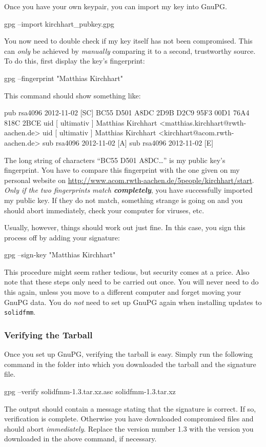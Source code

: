 \documentclass{scrbook}
\newcommand{\solidfmm}{\texttt{solidfmm}}
\begin{document}
Once you have your own keypair, you can import my key into GnuPG.
\begin{commandshell*}
gpg --import kirchhart_pubkey.gpg
\end{commandshell*}
You now need to double check if my key itself has not been compromised. This
can \emph{only} be achieved by \emph{manually} comparing it to a second,
trustworthy source. To do this, first display the key's fingerprint:
\begin{commandshell*}
gpg --fingerprint "Matthias Kirchhart"
\end{commandshell*}
This command should show something like:
\begin{commandshell*}
pub   rsa4096 2012-11-02 [SC]
      BC55 D501 A8DC 2D9B D2C9  95F3 00D1 76A4 818C 2BCE
uid        [ ultimativ ] Matthias Kirchhart <matthias.kirchhart@rwth-aachen.de>
uid        [ ultimativ ] Matthias Kirchhart <kirchhart@acom.rwth-aachen.de>
sub   rsa4096 2012-11-02 [A]
sub   rsa4096 2012-11-02 [E]
\end{commandshell*}
The long string of characters \enquote{BC55 D501 A8DC…} is my public key's
fingerprint. You have to compare this fingerprint with the one given on
my personal website on
\url{http://www.acom.rwth-aachen.de/5people/kirchhart/start}.
\emph{Only if the two fingerprints match \textbf{completely}}, you have
successfully imported my public key. If they do not match, something strange
is going on and you should abort immediately, check your computer for viruses,
etc.

Usually, however, things should work out just fine. In this case, you sign this
process off by adding your signature:
\begin{commandshell*}
gpg --sign-key "Matthias Kirchhart"
\end{commandshell*}
This procedure might seem rather tedious, but security comes at a price. Also
note  that these steps only need to be carried out once. You will never need to
do this again, unless you move to a different computer and forget moving your
GnuPG data. You do \emph{not} need to set up GnuPG again when installing
updates to \solidfmm.

\subsubsection{Verifying the Tarball}
Once you set up GnuPG, verifying the tarball is easy. Simply run the following
command in the folder into which you downloaded the tarball and the signature
file. 
\begin{commandshell*}
gpg --verify solidfmm-1.3.tar.xz.asc solidfmm-1.3.tar.xz
\end{commandshell*}
The output should contain a message stating that the signature is correct. If
so, verification is complete. Otherwise you have downloaded compromised files
and should abort \emph{immediately}. Replace the version number {1{.}3} with the
version you downloaded in the above command, if necessary.
\end{document}
